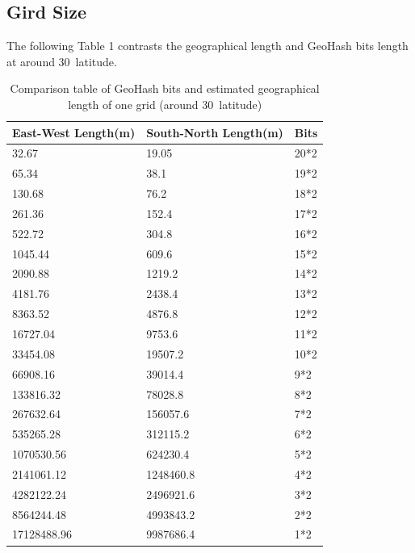 \documentclass[sigplan,screen]{acmart}
\begin{document}
\subsection{Gird Size}
The following Table 1 contrasts the geographical length and GeoHash bits length at around 30\degree\ latitude.
\begin{table}[htb]
	\caption{Comparison table of GeoHash bits and estimated geographical length of one grid (around 30\degree\ latitude)}
	\begin{tabular}{lll}
		\toprule
		East-West Length(m) & South-North Length(m) & Bits \\
		\midrule
		32.67               & 19.05                 & 20*2 \\
		65.34               & 38.1                  & 19*2 \\
		130.68              & 76.2                  & 18*2 \\
		261.36              & 152.4                 & 17*2 \\
		522.72              & 304.8                 & 16*2 \\
		1045.44             & 609.6                 & 15*2 \\
		2090.88             & 1219.2                & 14*2 \\
		4181.76             & 2438.4                & 13*2 \\
		8363.52             & 4876.8                & 12*2 \\
		16727.04            & 9753.6                & 11*2 \\
		33454.08            & 19507.2               & 10*2 \\
		66908.16            & 39014.4               & 9*2  \\
		133816.32           & 78028.8               & 8*2  \\
		267632.64           & 156057.6              & 7*2  \\
		535265.28           & 312115.2              & 6*2  \\
		1070530.56          & 624230.4              & 5*2  \\
		2141061.12          & 1248460.8             & 4*2  \\
		4282122.24          & 2496921.6             & 3*2  \\
		8564244.48          & 4993843.2             & 2*2  \\
		17128488.96         & 9987686.4             & 1*2  \\
		\bottomrule
	\end{tabular}
\end{table}
\end{document}
